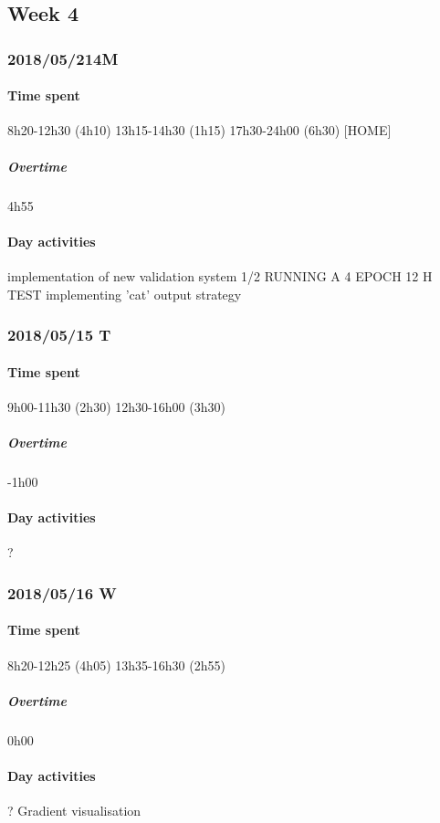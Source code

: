 \subsection{Week 4}
\subsubsection{2018/05/214M}
\paragraph{Time spent}
{8h20}-{12h30} (4h10)
{13h15}-{14h30} (1h15)
{17h30}-{24h00} (6h30) [HOME]

\subparagraph{Overtime}
4h55

\paragraph{Day activities}
implementation of new validation system 1/2
RUNNING A 4 EPOCH 12 H TEST
implementing 'cat' output strategy

\subsubsection{2018/05/15 T}
\paragraph{Time spent}
{9h00}-{11h30} (2h30)
{12h30}-{16h00} (3h30) 

\subparagraph{Overtime}
-1h00

\paragraph{Day activities}
?

\subsubsection{2018/05/16 W}
\paragraph{Time spent}
{8h20}-{12h25} (4h05)
{13h35}-{16h30} (2h55) 

\subparagraph{Overtime}
0h00

\paragraph{Day activities}
? Gradient visualisation

